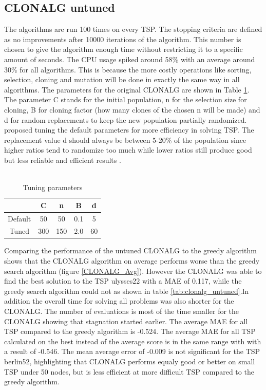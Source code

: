 \subsection{CLONALG untuned}
The algorithms are run 100 times on every TSP. The stopping criteria are defined as no improvements after 10000 iterations of the algorithm. This number is chosen to give the algorithm enough time without restricting it to a specific amount of seconds. The CPU usage spiked around 58\% with an average around 30\% for all algorithms. This is because the more costly operations like sorting, selection, cloning and mutation will be done in exactly the same way in all algorithms.
The parameters for the original CLONALG are shown in Table \ref{tuning}.\\
The parameter C stands for the initial population, n for the selection size for cloning, B for cloning factor (how many clones of the chosen n will be made) and d for random replacements to keep the new population partially randomized. \cite{DEC02} proposed tuning the default parameters for more efficiency in solving TSP. The replacement value d should always be between 5-20\% of the population since higher ratios tend to randomize too much while lower ratios still produce good but less reliable and efficient results \cite{DEC02}.\\\\
\begin{table}[H]
	\begin{tabular}{|c|c|c|c|c|}
		\hline
		& C   & n   & B   & d  \\ \hline
		Default & 50  & 50  & 0.1 & 5  \\ \hline
		Tuned   & 300 & 150 & 2.0 & 60 \\ \hline
	\end{tabular}
	\caption{Tuning parameters}
	\label{tuning}
\end{table} 
Comparing the performance of the untuned CLONALG to the greedy algorithm shows that the CLONALG algorithm on average performs worse than the greedy search algorithm (figure \ref{CLONALG_Avg}). However the CLONALG was able to find the best solution to the TSP ulysses22 with a MAE of 0.117, while the greedy search algorithm could not as shown in table \ref{tab:clonalg_untuned}.In addition the overall time for solving all problems was also shorter for the CLONALG. The number of evaluations is most of the time smaller for the CLONALG showing that stagnation started earlier. The average MAE for all TSP compared to the greedy algorithm is -0.524. The average MAE for all TSP calculated on the best instead of the average score is in the same range with with a result of -0.546. The mean average error of -0.009 is not significant for the TSP berlin52, highlighting that CLONALG performs equaly good or better on small TSP under 50 nodes, but is less efficient at more difficult TSP compared to the greedy algorithm.
